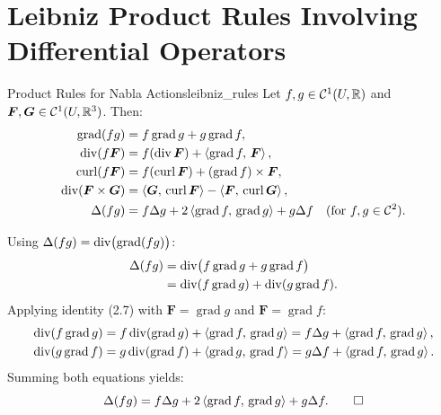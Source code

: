 \section{Leibniz Product Rules Involving Differential Operators}

\begin{proposition}{Product Rules for Nabla Actions}{leibniz_rules}
Let $f, g \in \mathcal{C}^1(U, \mathbb{R})$ and $\bm{F}, \bm{G} \in \mathcal{C}^1(U, \mathbb{R}^3)$. Then:
\begin{align}
    \operatorname{grad}(fg) &= f \operatorname{grad} g + g \operatorname{grad} f, \\
    \operatorname{div}(f \bm{F}) &= f (\operatorname{div} \bm{F}) + \left\langle \operatorname{grad} f, \, \bm{F} \right\rangle, \\
    \operatorname{curl}(f \bm{F}) &= f (\operatorname{curl} \bm{F}) + (\operatorname{grad} f) \times \bm{F}, \\
    \operatorname{div}(\bm{F} \times \bm{G}) &= \left\langle \bm{G}, \, \operatorname{curl} \bm{F} \right\rangle - \left\langle \bm{F}, \, \operatorname{curl} \bm{G} \right\rangle, \\
    \Delta (fg) &= f \Delta g + 2 \left\langle \operatorname{grad} f, \, \operatorname{grad} g \right\rangle + g \Delta f \quad (\text{for } f, g \in \mathcal{C}^2).
\end{align}
\end{proposition}

\begin{demonstration}
Using $\Delta(fg) = \operatorname{div} \bigl( \operatorname{grad} (fg) \bigr)$:
\begin{align*}
    \Delta (fg) &= \operatorname{div} \bigl( f \operatorname{grad} g + g \operatorname{grad} f \bigr) \\
    &= \operatorname{div} (f \operatorname{grad} g) + \operatorname{div} (g \operatorname{grad} f).
\end{align*}
Applying identity (2.7) with $\bm{F} = \operatorname{grad} g$ and $\bm{F} = \operatorname{grad} f$:
\begin{align*}
    \operatorname{div} (f \operatorname{grad} g) &= f \operatorname{div}(\operatorname{grad} g) + \left\langle \operatorname{grad} f, \, \operatorname{grad} g \right\rangle = f \Delta g + \left\langle \operatorname{grad} f, \, \operatorname{grad} g \right\rangle, \\
    \operatorname{div} (g \operatorname{grad} f) &= g \operatorname{div}(\operatorname{grad} f) + \left\langle \operatorname{grad} g, \, \operatorname{grad} f \right\rangle = g \Delta f + \left\langle \operatorname{grad} f, \, \operatorname{grad} g \right\rangle.
\end{align*}
Summing both equations yields:
\begin{equation*}
    \Delta (fg) = f \Delta g + 2 \left\langle \operatorname{grad} f, \, \operatorname{grad} g \right\rangle + g \Delta f. \qedhere
\end{equation*}
\end{demonstration}

